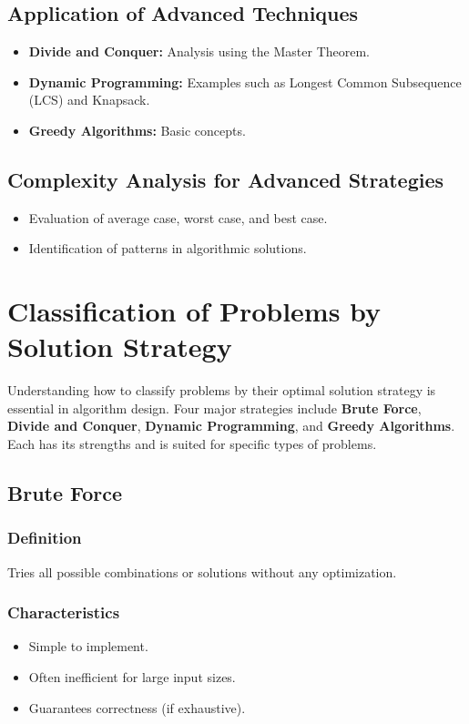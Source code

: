 \documentclass[12pt]{article}
\begin{document}
\subsection*{Application of Advanced Techniques}
\begin{itemize}
    \item \textbf{Divide and Conquer:} Analysis using the Master Theorem.
    \item \textbf{Dynamic Programming:} Examples such as Longest Common Subsequence (LCS) and Knapsack.
    \item \textbf{Greedy Algorithms:} Basic concepts.
\end{itemize}

\subsection*{Complexity Analysis for Advanced Strategies}
\begin{itemize}
    \item Evaluation of average case, worst case, and best case.
    \item Identification of patterns in algorithmic solutions.
\end{itemize}

\section{Classification of Problems by Solution Strategy}
Understanding how to classify problems by their optimal solution strategy is essential in algorithm design. Four major strategies include \textbf{Brute Force}, \textbf{Divide and Conquer}, \textbf{Dynamic Programming}, and \textbf{Greedy Algorithms}. Each has its strengths and is suited for specific types of problems.

\subsection{Brute Force}

\subsubsection{Definition}
Tries all possible combinations or solutions without any optimization.

\subsubsection{Characteristics}
\begin{itemize}
    \item Simple to implement.
    \item Often inefficient for large input sizes.
    \item Guarantees correctness (if exhaustive).
\end{itemize}
\end{document}

